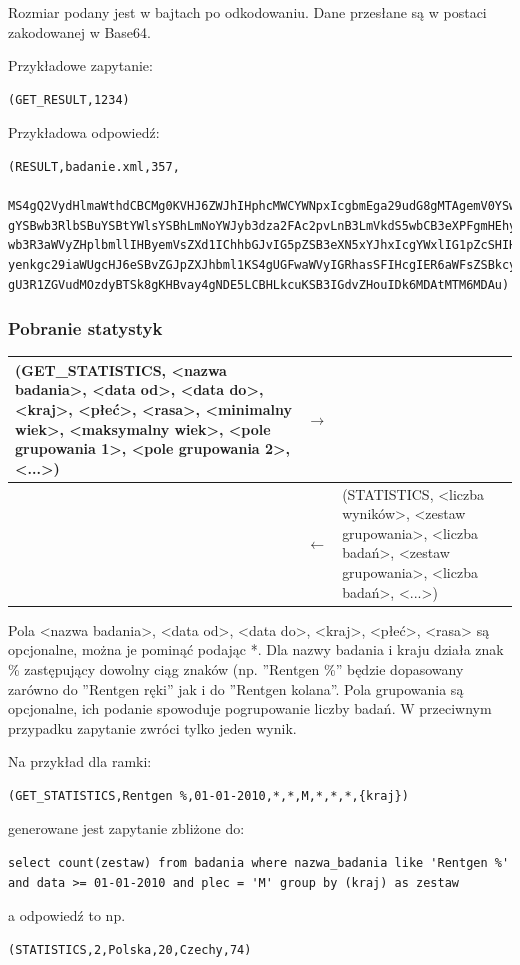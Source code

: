 Rozmiar podany jest w bajtach po odkodowaniu.
Dane przesłane są w postaci zakodowanej w Base64.

Przykładowe zapytanie:
\begin{lstlisting}[style=incode]
(GET_RESULT,1234)
\end{lstlisting}
Przykładowa odpowiedź:
\begin{lstlisting}[style=incode]
(RESULT,badanie.xml,357,
 MS4gQ2VydHlmaWthdCBCMg0KVHJ6ZWJhIHphcMWCYWNpxIcgbmEga29udG8gMTAgemV0YSw
gYSBwb3RlbSBuYSBtYWlsYSBhLmNoYWJyb3dza2FAc2pvLnB3LmVkdS5wbCB3eXPFgmHEhyB
wb3R3aWVyZHplbmllIHByemVsZXd1IChhbGJvIG5pZSB3eXN5xYJhxIcgYWxlIG1pZcSHIHB
yenkgc29iaWUgcHJ6eSBvZGJpZXJhbml1KS4gUGFwaWVyIGRhasSFIHcgIER6aWFsZSBkcy4
gU3R1ZGVudMOzdyBTSk8gKHBvay4gNDE5LCBHLkcuKSB3IGdvZHouIDk6MDAtMTM6MDAu)
\end{lstlisting}


\subsubsection{Pobranie statystyk}

\begin{longtable}{| p{} | p{}| p{} |} 
\hline
(GET\_STATISTICS, <nazwa badania>, <data od>, <data do>, <kraj>, <płeć>, <rasa>, <minimalny wiek>, <maksymalny wiek>, {<pole grupowania 1>, <pole grupowania 2>, <...>}) & $\rightarrow$ &  \\ \hline
 & $\leftarrow$ & (STATISTICS, <liczba wyników>, <zestaw grupowania>, <liczba badań>, <zestaw grupowania>, <liczba badań>, <...>) \\ \hline
\end{longtable}

Pola <nazwa badania>, <data od>, <data do>, <kraj>, <płeć>, <rasa> są opcjonalne, można je pominąć podając *. Dla nazwy badania i kraju działa znak \% zastępujący dowolny ciąg znaków (np. ''Rentgen \%'' będzie dopasowany zarówno do ''Rentgen ręki'' jak i do ''Rentgen kolana''.
Pola grupowania są opcjonalne, ich podanie spowoduje pogrupowanie liczby badań. W przeciwnym przypadku zapytanie zwróci tylko jeden wynik.

Na przykład dla ramki:
\begin{lstlisting}[style=incode]
(GET_STATISTICS,Rentgen %,01-01-2010,*,*,M,*,*,*,{kraj})
\end{lstlisting}
generowane jest zapytanie zbliżone do:
\begin{lstlisting}[style=incode]
select count(zestaw) from badania where nazwa_badania like 'Rentgen %'
and data >= 01-01-2010 and plec = 'M' group by (kraj) as zestaw
\end{lstlisting}
a odpowiedź to np.
\begin{lstlisting}[style=incode]
(STATISTICS,2,Polska,20,Czechy,74)
\end{lstlisting}

